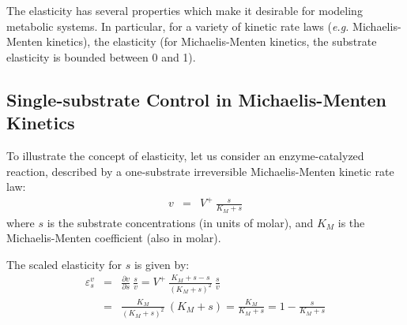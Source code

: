 \documentclass[12pt,a4paper]{article}
\begin{document}
The elasticity has several properties which make it desirable for modeling metabolic systems. In particular, for a variety of kinetic rate laws (\textit{e.g.} Michaelis-Menten kinetics), the elasticity (for Michaelis-Menten kinetics, the substrate elasticity is bounded between 0 and 1). 

\subsection{Single-substrate Control in Michaelis-Menten Kinetics}
To illustrate the concept of elasticity, let us consider an enzyme-catalyzed reaction, described by a one-substrate irreversible Michaelis-Menten kinetic rate law:
\begin{eqnarray}
    v &=& V^+ ~ \frac{s}{K_M + s}
\end{eqnarray}
where $s$ is the substrate concentrations (in units of molar), and $K_M$ is the Michaelis-Menten coefficient (also in molar).

\begin{center}
\end{center}

The scaled elasticity for $s$ is given by:
\begin{eqnarray}
    \varepsilon_s^v &=& \frac{\partial v}{\partial s} ~ \frac{s}{v} = V^+ ~ \frac{K_M + s - s}{(K_M + s)^2} ~ \frac{s}{v} \nonumber \\
    &=& \frac{K_M}{(K_M + s)^2} ~ (K_M + s) = \frac{K_M}{K_M + s} = 1 - \frac{s}{K_M + s}\label{eq:eps_s_v_irr}
\end{eqnarray}

\begin{center}
\end{center}
\end{document}
